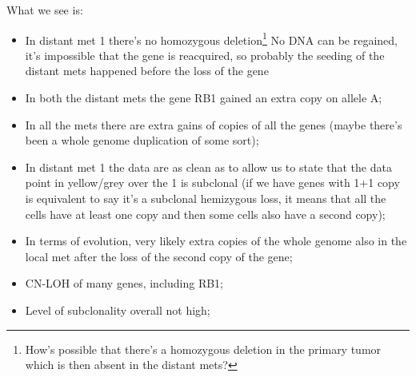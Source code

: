 What we see is:
\begin{itemize}
\item
  In distant met 1 there's no homozygous deletion\footnote{How's possible that there's a homozygous deletion in the primary tumor which is then absent in the distant mets?} No DNA can be regained, it's impossible that the gene is reacquired, so probably the seeding of the distant mets happened before the loss of the gene
\item
  In both the distant mets the gene RB1 gained an extra copy on allele A;
\item
  In all the mets there are extra gains of copies of all the genes (maybe there's been a whole genome duplication of some sort);
\item
  In distant met 1 the data are as clean as to allow us to state that the data point in yellow/grey over the 1 is subclonal (if we have genes with 1+1 copy is equivalent to say it's a subclonal hemizygous loss, it means that all the cells have at least one copy and then some cells also have a second copy);
\item
  In terms of evolution, very likely extra copies of the whole genome also in the local met after the loss of the second copy of the gene;
\item
  CN-LOH of many genes, including RB1;
\item
  Level of subclonality overall not high;
\end{itemize}

